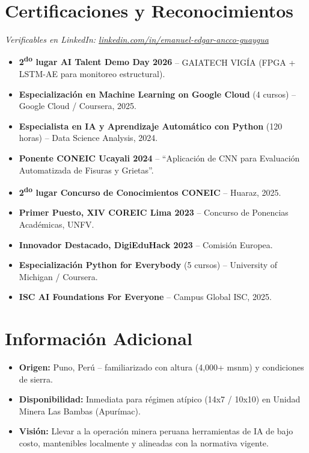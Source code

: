 \documentclass[10pt, a4paper]{article}
\begin{document}
\section*{Certificaciones y Reconocimientos}
\textit{\small Verificables en LinkedIn: \href{https://www.linkedin.com/in/emanuel-edgar-ancco-guaygua-a61210352}{linkedin.com/in/emanuel-edgar-ancco-guaygua}}
\vspace{1mm}
\begin{itemize}
    \item \textbf{2\textsuperscript{do} lugar AI Talent Demo Day 2026} -- GAIATECH VIGÍA (FPGA + LSTM-AE para monitoreo estructural).
    \item \textbf{Especialización en Machine Learning on Google Cloud} (4 cursos) -- Google Cloud / Coursera, 2025.
    \item \textbf{Especialista en IA y Aprendizaje Automático con Python} (120 horas) -- Data Science Analysis, 2024.
    \item \textbf{Ponente CONEIC Ucayali 2024} -- ``Aplicación de CNN para Evaluación Automatizada de Fisuras y Grietas''.
    \item \textbf{2\textsuperscript{do} lugar Concurso de Conocimientos CONEIC} -- Huaraz, 2025.
    \item \textbf{Primer Puesto, XIV COREIC Lima 2023} -- Concurso de Ponencias Académicas, UNFV.
    \item \textbf{Innovador Destacado, DigiEduHack 2023} -- Comisión Europea.
    \item \textbf{Especialización Python for Everybody} (5 cursos) -- University of Michigan / Coursera.
    \item \textbf{ISC AI Foundations For Everyone} -- Campus Global ISC, 2025.
\end{itemize}

\section*{Información Adicional}
\begin{itemize}
    \item \textbf{Origen:} Puno, Perú -- familiarizado con altura (4,000+ msnm) y condiciones de sierra.
    \item \textbf{Disponibilidad:} Inmediata para régimen atípico (14x7 / 10x10) en Unidad Minera Las Bambas (Apurímac).
    \item \textbf{Visión:} Llevar a la operación minera peruana herramientas de IA de bajo costo, mantenibles localmente y alineadas con la normativa vigente.
\end{itemize}
\end{document}
